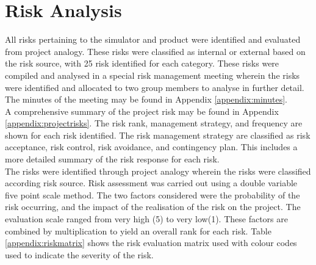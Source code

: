 \section{Risk Analysis}

All risks pertaining to the simulator and product were identified and evaluated from project analogy. These risks were classified as internal or external based on the risk source, with 25 risk identified for each category. These risks were compiled and analysed in a special risk management meeting wherein the risks were identified and allocated to two group members to analyse in further detail. The minutes of the meeting may be found in Appendix \ref{appendix:minutes}.\\

\noindent
A comprehensive summary of the project risk may be found in Appendix \ref{appendix:projectrisks}. The risk rank, management strategy, and frequency are shown for each risk identified. The risk management strategy are classified as risk acceptance, risk control, risk avoidance, and contingency plan. This includes a more detailed summary of the risk response for each risk.\\

\noindent
The risks were identified through project analogy wherein the risks were classified according risk source. Risk assessment was carried out using a double variable five point scale method. The two factors considered were the probability of the risk occurring, and the impact of the realisation of the risk on the project. The evaluation scale ranged from very high (5) to very low(1). These factors are combined by multiplication to yield an overall rank for each risk. Table \ref{appendix:riskmatrix} shows the risk evaluation matrix used with colour codes used to indicate the severity of the risk. 


